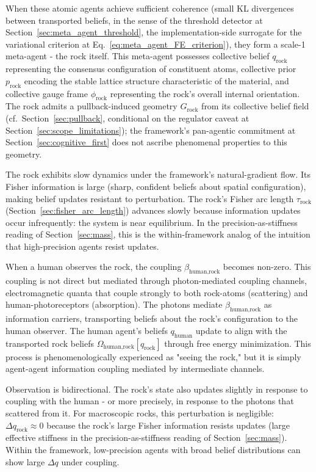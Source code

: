 \documentclass[11pt]{article}
\begin{document}
When these atomic agents achieve sufficient coherence (small KL divergences between transported beliefs, in the sense of the threshold detector at Section~\ref{sec:meta_agent_threshold}, the implementation-side surrogate for the variational criterion at Eq.~\eqref{eq:meta_agent_FE_criterion}), they form a scale-1 meta-agent - the rock itself. This meta-agent possesses collective belief $q_{\text{rock}}$ representing the consensus configuration of constituent atoms, collective prior $p_{\text{rock}}$ encoding the stable lattice structure characteristic of the material, and collective gauge frame $\phi_{\text{rock}}$ representing the rock's overall internal orientation. The rock admits a pullback-induced geometry $G_{\text{rock}}$ from its collective belief field (cf.\ Section~\ref{sec:pullback}, conditional on the regulator caveat at Section~\ref{sec:scope_limitations}); the framework's pan-agentic commitment at Section~\ref{sec:cognitive_first} does not ascribe phenomenal properties to this geometry.

The rock exhibits slow dynamics under the framework's natural-gradient flow. Its Fisher information is large (sharp, confident beliefs about spatial configuration), making belief updates resistant to perturbation. The rock's Fisher arc length $\tau_{\text{rock}}$ (Section~\ref{sec:fisher_arc_length}) advances slowly because information updates occur infrequently: the system is near equilibrium. In the precision-as-stiffness reading of Section~\ref{sec:mass}, this is the within-framework analog of the intuition that high-precision agents resist updates.

When a human observes the rock, the coupling $\beta_{\text{human,rock}}$ becomes non-zero. This coupling is not direct but mediated through photon-mediated coupling channels, electromagnetic quanta that couple strongly to both rock-atoms (scattering) and human-photoreceptors (absorption). The photons mediate $\beta_{\text{human,rock}}$ as information carriers, transporting beliefs about the rock's configuration to the human observer. The human agent's beliefs $q_{\text{human}}$ update to align with the transported rock beliefs $\Omega_{\text{human,rock}}[q_{\text{rock}}]$ through free energy minimization. This process is phenomenologically experienced as "seeing the rock," but it is simply agent-agent information coupling mediated by intermediate channels.

Observation is bidirectional. The rock's state also updates slightly in response to coupling with the human - or more precisely, in response to the photons that scattered from it. For macroscopic rocks, this perturbation is negligible: $\Delta q_{\text{rock}} \approx 0$ because the rock's large Fisher information resists updates (large effective stiffness in the precision-as-stiffness reading of Section~\ref{sec:mass}). Within the framework, low-precision agents with broad belief distributions can show large $\Delta q$ under coupling.
\end{document}
